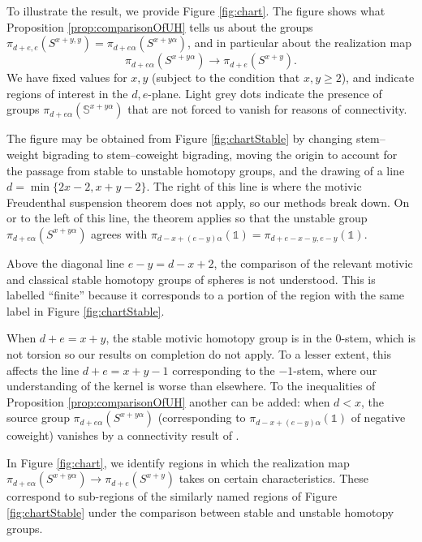 \documentclass[11pt, oneside, dvipsnames, svgnames, table, final]{amsart}
\theoremstyle{plain}
\theoremstyle{definition}
\theoremstyle{remark}
\newcommand{\<}[1]{{\langle}#1 {\rangle}}
\newcommand{\one}{\mathbb{1}}
\newcommand{\SpS}{\mathbb{S}}
\begin{document}
To illustrate the result, we provide Figure \ref{fig:chart}. The figure shows what Proposition \ref{prop:comparisonOfUH} tells us about the groups $\pi_{d+e,e}(S^{x+y,y}) = \pi_{d+e\alpha}(S^{x+y\alpha})$, and in particular about the realization map
\[ \pi_{d+e\alpha}(S^{x+y\alpha}) \to \pi_{d+e}(S^{x+y}). \] We have fixed values for $x,y$ (subject to the condition that $x, y \ge 2$), and indicate regions of interest in the $d,e$-plane. Light grey dots indicate the presence of groups $\pi_{d+e\alpha}(\SpS^{x+y\alpha})$ that are not forced to vanish for reasons of connectivity.

The figure may be obtained from Figure \ref{fig:chartStable} by changing stem--weight bigrading to stem--coweight bigrading, moving the origin to account for the passage from stable to unstable homotopy groups, and the drawing of a line $d=\min\{2x-2,x+y-2\}$. The right of this line is where the motivic Freudenthal suspension theorem does not apply, so our methods break down. On or to the left of this line, the theorem applies so that the unstable group $\pi_{d+e\alpha}(S^{x+y\alpha})$ agrees with $\pi_{d-x+(e-y)\alpha}(\one)=\pi_{d+e-x-y, e-y}(\one)$. 

Above the diagonal line $e-y=d-x+2$, the comparison of the relevant motivic and classical stable homotopy groups of spheres is not understood. This is labelled ``finite'' because it corresponds to a portion of the region with the same label in Figure \ref{fig:chartStable}.

When $d+e=x+y$, the stable motivic homotopy group is in the $0$-stem, which is not torsion so our results on completion do not apply. To a lesser extent, this affects the line $d+e=x+y-1$ corresponding to the $-1$-stem, where our understanding of the kernel is worse than elsewhere. To the inequalities of Proposition \ref{prop:comparisonOfUH} another can be added: when $d<x$, the source group $ \pi_{d+e\alpha}(S^{x+ y\alpha})$ (corresponding to $\pi_{d-x+(e-y)\alpha}(\one)$ of negative coweight) vanishes by a connectivity result of \cite{Morel2012}.

In Figure \ref{fig:chart}, we identify regions in which the realization map $\pi_{d+e\alpha}(S^{x+y\alpha}) \to \pi_{d+e}(S^{x+y})$ takes on certain characteristics. These correspond to sub-regions of the similarly named regions of Figure \ref{fig:chartStable} under the comparison between stable and unstable homotopy groups.
\end{document}
